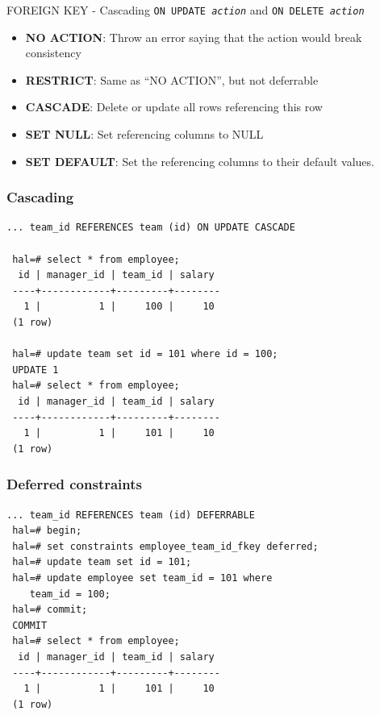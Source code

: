 \documentclass{beamer}
\begin{document}
\begin{frame}{FOREIGN KEY - Cascading}
    \texttt{ON UPDATE \emph{action}} and \texttt{ON DELETE \emph{action}}
    \begin{itemize}
        \item {\bf NO ACTION}: Throw an error saying that the action would break consistency
        \item {\bf RESTRICT}: Same as ``NO ACTION'', but not deferrable
        \item {\bf CASCADE}: Delete or update all rows referencing this row
        \item {\bf SET NULL}: Set referencing columns to NULL
        \item {\bf SET DEFAULT}: Set the referencing columns to their default values.
    \end{itemize}
\end{frame}

\begin{frame}[fragile]
    \frametitle{Cascading}
    \begin{Verbatim}[fontfamily=courier]
... team_id REFERENCES team (id) ON UPDATE CASCADE

 hal=# select * from employee;
  id | manager_id | team_id | salary
 ----+------------+---------+--------
   1 |          1 |     100 |     10
 (1 row)
 
 hal=# update team set id = 101 where id = 100;
 UPDATE 1
 hal=# select * from employee;
  id | manager_id | team_id | salary
 ----+------------+---------+--------
   1 |          1 |     101 |     10
 (1 row)
    \end{Verbatim}
\end{frame}

\begin{frame}[fragile]
    \frametitle{Deferred constraints}
    \begin{Verbatim}[fontfamily=courier]
 ... team_id REFERENCES team (id) DEFERRABLE
 hal=# begin;
 hal=# set constraints employee_team_id_fkey deferred;
 hal=# update team set id = 101;
 hal=# update employee set team_id = 101 where
    team_id = 100;
 hal=# commit;
 COMMIT
 hal=# select * from employee;
  id | manager_id | team_id | salary
 ----+------------+---------+--------
   1 |          1 |     101 |     10
 (1 row)
    \end{Verbatim}
\end{frame}
\end{document}
